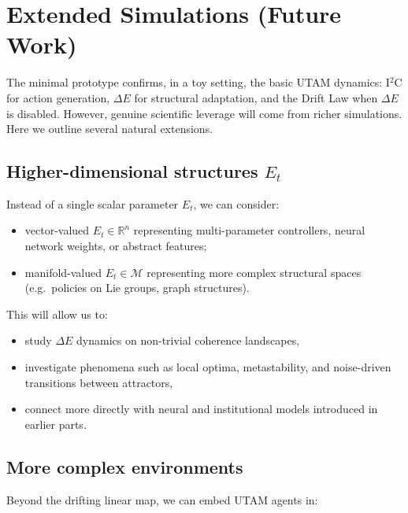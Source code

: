 \documentclass[12pt,a4paper]{report}
\begin{document}
\section{Extended Simulations (Future Work)}

The minimal prototype confirms, in a toy setting, the basic UTAM dynamics: I$^2$C for action generation, $\Delta E$ for structural adaptation, and the Drift Law when $\Delta E$ is disabled. However, genuine scientific leverage will come from richer simulations. Here we outline several natural extensions.

\subsection*{Higher-dimensional structures \texorpdfstring{$E_t$}{E\_t}}

Instead of a single scalar parameter \(E_t\), we can consider:

\begin{itemize}[leftmargin=2em]
    \item vector-valued \(E_t \in \mathbb{R}^n\) representing multi-parameter controllers, neural network weights, or abstract features;
    \item manifold-valued \(E_t \in \mathcal{M}\) representing more complex structural spaces (e.g.\ policies on Lie groups, graph structures).
\end{itemize}

This will allow us to:

\begin{itemize}[leftmargin=2em]
    \item study $\Delta E$ dynamics on non-trivial coherence landscapes,
    \item investigate phenomena such as local optima, metastability, and noise-driven transitions between attractors,
    \item connect more directly with neural and institutional models introduced in earlier parts.
\end{itemize}

\subsection*{More complex environments}

Beyond the drifting linear map, we can embed UTAM agents in:
\end{document}
